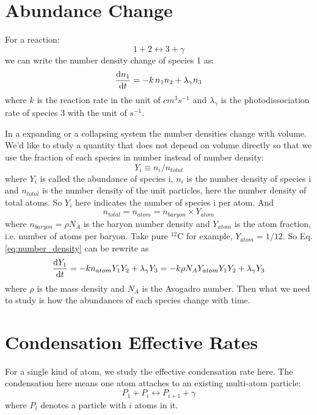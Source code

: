 \documentclass{article}
\begin{document}
\section{Abundance Change}

For a reaction:
\[
1 + 2 \longleftrightarrow 3 + \gamma
\]
we can write the number density change of species 1 as:
\begin{equation}
\frac{{\rm d}n_1}{{\rm d}t} = 
  -k \, n_1 n_2 + \lambda_\gamma n_3
\label{eq:number_density}
\end{equation}
where $k$ is the reaction rate in the unit of $cm^3s^{-1}$ and 
$\lambda_\gamma$ is the photodissociation rate of species 3 with the unit of
$s^{-1}$.

In a expanding or a collapsing system the number densities change with volume. 
We'd like to study a quantity that does not depend on volume directly so that
we use the fraction of each species in number instead of number density:
\[
Y_i \equiv n_i / n_{total}
\]
where $Y_i$ is called the abundance of species i, $n_i$ is the number density
of species i and $n_{total}$ is the number density of the unit particles, here
the number density of total atoms. So $Y_i$ here indicates the number
of species i per atom. And
\[
n_{total} = n_{atom} = n_{baryon} \times Y_{atom} 
\]
where $n_{baryon} = \rho N_A$ is the baryon number density and $Y_{atom}$ is
the atom fraction, i.e. number of atoms per baryon. Take pure $^{12}$C for 
example, $Y_{atom} = 1 / 12$. So Eq.\ref{eq:number_density} can be rewrite as
\begin{equation}
\frac{{\rm d}Y_1}{{\rm d}t} = 
  -k n_{atom} Y_1 Y_2 + \lambda_\gamma Y_3 =
  -k \rho N_A Y_{atom} Y_1 Y_2 + \lambda_\gamma Y_3
\label{eq:abundance}
\end{equation}
where $\rho$ is the mass density and $N_A$ is the Avogadro number. Then what
we need to study is how the abundances of each species change with time.

\section{Condensation Effective Rates}

For a single kind of atom, we study the effective condensation rate here.
The condensation here means one atom attaches to an existing multi-atom
particle:
\begin{equation}
P_1 + P_i \longleftrightarrow P_{i+1} + \gamma
\label{eq:reaction}
\end{equation} 
where $P_i$ denotes a particle with $i$ atoms in it.
\end{document}
